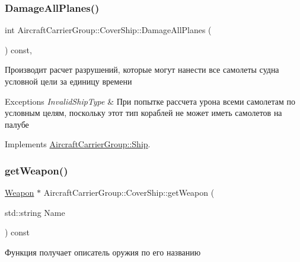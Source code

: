 \subsubsection{\texorpdfstring{Damage\+All\+Planes()}{DamageAllPlanes()}}
{\footnotesize\ttfamily int Aircraft\+Carrier\+Group\+::\+Cover\+Ship\+::\+Damage\+All\+Planes (\begin{DoxyParamCaption}{ }\end{DoxyParamCaption}) const\hspace{0.3cm}{\ttfamily [inline]}, {\ttfamily [virtual]}}



Производит расчет разрушений, которые могут нанести все самолеты судна условной цели за единицу времени 


\begin{DoxyExceptions}{Exceptions}
{\em Invalid\+Ship\+Type} & При попытке рассчета урона всеми самолетам по условным целям, поскольку этот тип кораблей не может иметь самолетов на палубе \\
\hline
\end{DoxyExceptions}


Implements \mbox{\hyperlink{class_aircraft_carrier_group_1_1_ship_a2731c146c8edfc3a799661d249ccf522}{Aircraft\+Carrier\+Group\+::\+Ship}}.

\mbox{\label{class_aircraft_carrier_group_1_1_cover_ship_ab587c598ab12561d4ecad32c5f55a04e}} 
\subsubsection{\texorpdfstring{get\+Weapon()}{getWeapon()}}
{\footnotesize\ttfamily \mbox{\hyperlink{class_aircraft_carrier_group_1_1_weapon}{Weapon}} $\ast$ Aircraft\+Carrier\+Group\+::\+Cover\+Ship\+::get\+Weapon (\begin{DoxyParamCaption}\item[{std\+::string}]{Name }\end{DoxyParamCaption}) const\hspace{0.3cm}{\ttfamily [virtual]}}



Функция получает описатель оружия по его названию 


